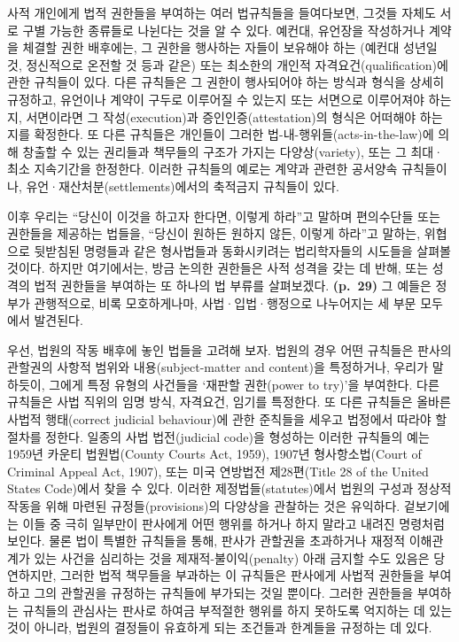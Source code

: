 사적 개인에게 법적 권한들을 부여하는 여러 법규칙들을 들여다보면, 그것들
자체도 서로 구별 가능한 종류들로 나뉜다는 것을 알 수 있다. 예컨대,
유언장을 작성하거나 계약을 체결할 권한 배후에는, 그 권한을 행사하는
자들이 보유해야 하는 (예컨대 성년일 것, 정신적으로 온전할 것 등과 같은)
 또는 최소한의 개인적 자격요건(qualification)에
관한 규칙들이 있다. 다른 규칙들은 그 권한이 행사되어야 하는 방식과
형식을 상세히 규정하고, 유언이나 계약이 구두로 이루어질 수 있는지 또는
서면으로 이루어져야 하는지, 서면이라면 그 작성(execution)과
증인인증(attestation)의 형식은 어떠해야 하는지를 확정한다. 또 다른
규칙들은 개인들이 그러한 법-내-행위들(acts-in-the-law)에 의해 창출할 수
있는 권리들과 책무들의 구조가 가지는 다양상(variety), 또는 그 최대·최소
지속기간을 한정한다. 이러한 규칙들의 예로는 계약과 관련한 공서양속
규칙들이나, 유언·재산처분(settlements)에서의 축적금지 규칙들이 있다.

이후 우리는 “당신이 이것을 하고자 한다면, 이렇게 하라”고 말하며
편의수단들 또는 권한들을 제공하는 법들을, “당신이 원하든 원하지 않든,
이렇게 하라”고 말하는, 위협으로 뒷받침된 명령들과 같은 형사법들과
동화시키려는 법리학자들의 시도들을 살펴볼 것이다. 하지만 여기에서는,
방금 논의한 권한들은 사적 성격을 갖는 데 반해,  또는
 성격의 법적 권한들을 부여하는 또 하나의 법
부류를 살펴보겠다. \textbf{(p.~29)} 그 예들은 정부가 관행적으로, 비록
모호하게나마, 사법·입법·행정으로 나누어지는 세 부문 모두에서 발견된다.

우선, 법원의 작동 배후에 놓인 법들을 고려해 보자. 법원의 경우 어떤
규칙들은 판사의 관할권의 사항적 범위와 내용(subject-matter and
content)을 특정하거나, 우리가 말하듯이, 그에게 특정 유형의 사건들을
‘재판할 권한(power to try)’을 부여한다. 다른 규칙들은 사법 직위의 임명
방식, 자격요건, 임기를 특정한다. 또 다른 규칙들은 올바른 사법적
행태(correct judicial behaviour)에 관한 준칙들을 세우고 법정에서 따라야
할 절차를 정한다. 일종의 사법 법전(judicial code)을 형성하는 이러한
규칙들의 예는 1959년 카운티 법원법(County Courts Act, 1959), 1907년
형사항소법(Court of Criminal Appeal Act, 1907), 또는 미국 연방법전
제28편(Title 28 of the United States Code)에서 찾을 수 있다. 이러한
제정법들(statutes)에서 법원의 구성과 정상적 작동을 위해 마련된
규정들(provisions)의 다양상을 관찰하는 것은 유익하다. 겉보기에는 이들 중
극히 일부만이 판사에게 어떤 행위를 하거나 하지 말라고 내려진 명령처럼
보인다. 물론 법이 특별한 규칙들을 통해, 판사가 관할권을 초과하거나
재정적 이해관계가 있는 사건을 심리하는 것을 제재적-불이익(penalty) 아래
금지할 수도 있음은 당연하지만, 그러한 법적 책무들을 부과하는 이 규칙들은
판사에게 사법적 권한들을 부여하고 그의 관할권을 규정하는 규칙들에
부가되는 것일 뿐이다. 그러한 권한들을 부여하는 규칙들의 관심사는 판사로
하여금 부적절한 행위를 하지 못하도록 억지하는 데 있는 것이 아니라,
법원의 결정들이 유효하게 되는 조건들과 한계들을 규정하는 데 있다.


